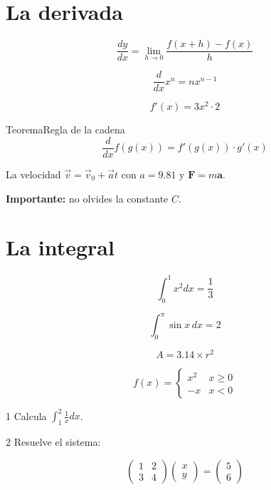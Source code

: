\documentclass[11pt]{article}
\title{#1}\author{#2}\date{}%
\begin{document}

\section*{La derivada}

\[
\frac{dy}{dx}= \lim_{h \to 0}\frac{f(x + h) - f(x)}{h}
\]

\[
\frac{d}{dx}x^{n} = n x^{n-1}
\]

\[
f'(x) = 3x^{2} \cdot 2
\]

\begin{cltheorem}{Teorema}{Regla de la cadena}
\[
\frac{d}{dx}f(g(x)) = f'(g(x)) \cdot g'(x)
\]
\end{cltheorem}

La velocidad \(\vec{v}= \vec{v}_{0} + \vec{a}t\) con \(a = 9.81\) y \(\mathbf{F}= m \mathbf{a}\).

\textcolor{clRed}{\textbf{Importante: }}no olvides la constante \textcolor{clBlue}{\(C\)}.

\section*{La integral}

\[
\int_{0}^{1} x^{2} dx = \frac{1}{3}
\]

\[
\int_{0}^{\pi}\sin x \, dx = 2
\]

\[
A = 3.14 \times r^{2}
\]

\[
f(x) = \begin{cases}x^{2}&x \geq 0 \\ -x&x < 0\end{cases}
\]

\begin{clproblem}{1}{}
Calcula \(\int_{1}^{2} \frac{1}{x}dx\).

\end{clproblem}

\begin{clproblem}{2}{}
Resuelve el sistema:

\[
\begin{pmatrix}1 & 2 \\ 3 & 4\end{pmatrix} \begin{pmatrix}x \\ y\end{pmatrix} = \begin{pmatrix}5 \\ 6\end{pmatrix}
\]
\end{clproblem}
\end{document}
